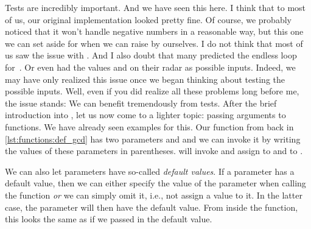Tests are incredibly important.
And we have seen this here.
I think that to most of us, our original  implementation looked pretty fine.
Of course, we probably noticed that it won't handle negative numbers in a reasonable way, but this one we can set aside for when we can raise  by ourselves.
I do not think that most of us saw the issue with .
And I also doubt that many predicted the endless loop for~.
Or even had the values  and  on their radar as possible inputs.
Indeed, we may have only realized this issue once we began thinking about testing the possible inputs.
Well, even if you did realize all these problems long before me, the issue stands:
We can benefit tremendously from tests.%
%
\endhsection%
%
%
%
%
%
%
%
%
%
After the brief introduction into , let us now come to a lighter topic: passing arguments to functions.%
We have already seen examples for this.
Our  function from back in \cref{lst:functions:def_gcd} has two parameters  and  and we can invoke it by writing the values of these parameters in parentheses.
 will invoke  and assign  to  and  to .

We can also let parameters have so-called \emph{default values}.
If a parameter has a default value, then we can either specify the value of the parameter when calling the function \emph{or} we can simply omit it, i.e., not assign a value to it.
In the latter case, the parameter will then have the default value.
From inside the function, this looks the same as if we passed in the default value.

